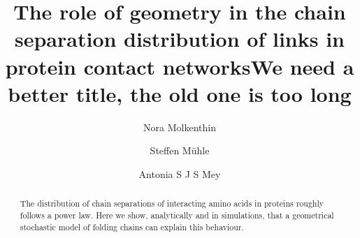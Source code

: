 \documentclass[reprint,amsmath,amssymb,rmp,onecolumn,notitlepage,11pt]{revtex4-1}
\newcommand{\red}[1]{\textcolor{red!80!black}{#1}}
\begin{document}
\title{The role of geometry in the chain separation distribution of links in protein contact networks}
\title{\red{We need a better title, the old one is too long}}
\author{Nora Molkenthin}
\author{Steffen Mühle}
\author{Antonia S J S Mey}

\begin{abstract}
The distribution of chain separations of interacting amino acids in proteins roughly follows a power law. Here we show, analytically and in simulations, that a geometrical stochastic model of folding chains can explain this behaviour. %
\end{abstract}
\maketitle
\end{document}
